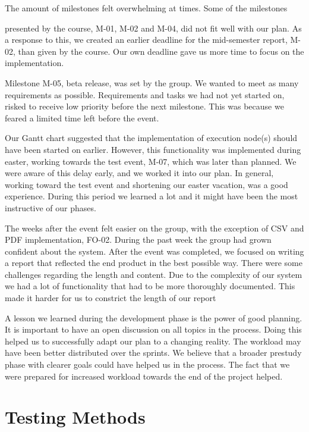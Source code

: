 The amount of milestones felt overwhelming at times. Some of the
milestones 

presented by the course, M-01, M-02 and M-04, did not fit well with our
plan. As a response to this, we created an earlier deadline for the
mid-semester report, M-02, than given by the course. Our own deadline
gave us more time to focus on the implementation. 

Milestone M-05, beta release, was set by the group. We wanted to meet as
many requirements as possible. Requirements and tasks we had not yet
started on, risked to receive low priority before the next milestone.
This was because we feared a limited time left before the event.

Our Gantt chart suggested that the implementation of execution node(s)
should have been started on earlier. However, this functionality was
implemented during easter, working towards the test event, M-07, which
was later than planned. We were aware of this delay early, and we
worked it into our plan. In general, working toward the test event and
shortening our easter vacation, was a good experience. During this
period we learned a lot and it might have been the most instructive of
our phases. 

The weeks after the event felt easier on the group, with the exception
of CSV and PDF implementation, FO-02. During the past week the group
had grown confident about the system. After the event was completed, we
focused on writing a report that reflected the end product in the best
possible way. There were some challenges regarding the length and
content. Due to the complexity of our system we had a lot of
functionality that had to be more thoroughly documented. This made it
harder for us to constrict the length of our report

A lesson we learned during the development phase is the power of good
planning. It is important to have an open discussion on all topics in
the process. Doing this helped us to successfully adapt our plan to a
changing reality. The workload may have been better distributed over
the sprints. We believe that a broader prestudy phase with clearer
goals could have helped us in the process. The fact that we were
prepared for increased workload towards the end of the project helped.

\section{Testing Methods}


